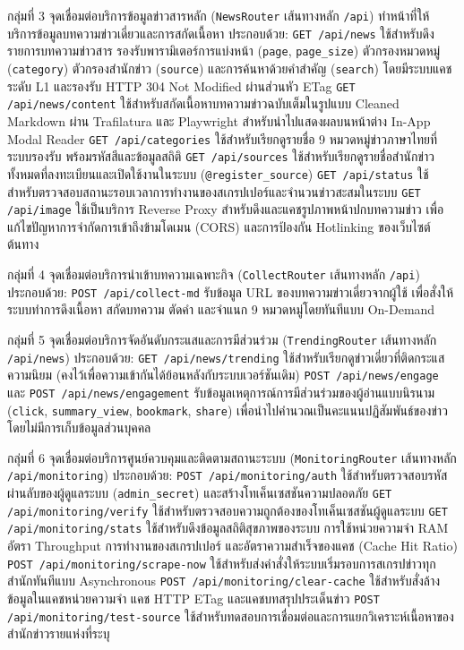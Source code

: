 กลุ่มที่ 3 จุดเชื่อมต่อบริการข้อมูลข่าวสารหลัก (\texttt{NewsRouter} เส้นทางหลัก \texttt{/api}) ทำหน้าที่ให้บริการข้อมูลบทความข่าวเดี่ยวและการสกัดเนื้อหา ประกอบด้วย:
\texttt{GET /api/news} ใช้สำหรับดึงรายการบทความข่าวสาร รองรับพารามิเตอร์การแบ่งหน้า (\texttt{page}, \texttt{page\_size}) ตัวกรองหมวดหมู่ (\texttt{category}) ตัวกรองสำนักข่าว (\texttt{source}) และการค้นหาด้วยคำสำคัญ (\texttt{search}) โดยมีระบบแคชระดับ L1 และรองรับ HTTP 304 Not Modified ผ่านส่วนหัว ETag
\texttt{GET /api/news/content} ใช้สำหรับสกัดเนื้อหาบทความข่าวฉบับเต็มในรูปแบบ Cleaned Markdown ผ่าน Trafilatura และ Playwright สำหรับนำไปแสดงผลบนหน้าต่าง In-App Modal Reader
\texttt{GET /api/categories} ใช้สำหรับเรียกดูรายชื่อ 9 หมวดหมู่ข่าวภาษาไทยที่ระบบรองรับ พร้อมรหัสสีและข้อมูลสถิติ
\texttt{GET /api/sources} ใช้สำหรับเรียกดูรายชื่อสำนักข่าวทั้งหมดที่ลงทะเบียนและเปิดใช้งานในระบบ (\texttt{@register\_source})
\texttt{GET /api/status} ใช้สำหรับตรวจสอบสถานะรอบเวลาการทำงานของสเกรปเปอร์และจำนวนข่าวสะสมในระบบ
\texttt{GET /api/image} ใช้เป็นบริการ Reverse Proxy สำหรับดึงและแคชรูปภาพหน้าปกบทความข่าว เพื่อแก้ไขปัญหาการจำกัดการเข้าถึงข้ามโดเมน (CORS) และการป้องกัน Hotlinking ของเว็บไซต์ต้นทาง

กลุ่มที่ 4 จุดเชื่อมต่อบริการนำเข้าบทความเฉพาะกิจ (\texttt{CollectRouter} เส้นทางหลัก \texttt{/api}) ประกอบด้วย:
\texttt{POST /api/collect-md} รับข้อมูล URL ของบทความข่าวเดี่ยวจากผู้ใช้ เพื่อสั่งให้ระบบทำการดึงเนื้อหา สกัดบทความ ตัดคำ และจำแนก 9 หมวดหมู่โดยทันทีแบบ On-Demand

กลุ่มที่ 5 จุดเชื่อมต่อบริการจัดอันดับกระแสและการมีส่วนร่วม (\texttt{TrendingRouter} เส้นทางหลัก \texttt{/api/news}) ประกอบด้วย:
\texttt{GET /api/news/trending} ใช้สำหรับเรียกดูข่าวเดี่ยวที่ติดกระแสความนิยม (คงไว้เพื่อความเข้ากันได้ย้อนหลังกับระบบเวอร์ชันเดิม)
\texttt{POST /api/news/engage} และ \texttt{POST /api/news/engagement} รับข้อมูลเหตุการณ์การมีส่วนร่วมของผู้อ่านแบบนิรนาม (\texttt{click}, \texttt{summary\_view}, \texttt{bookmark}, \texttt{share}) เพื่อนำไปคำนวณเป็นคะแนนปฏิสัมพันธ์ของข่าวโดยไม่มีการเก็บข้อมูลส่วนบุคคล

กลุ่มที่ 6 จุดเชื่อมต่อบริการศูนย์ควบคุมและติดตามสถานะระบบ (\texttt{MonitoringRouter} เส้นทางหลัก \texttt{/api/monitoring}) ประกอบด้วย:
\texttt{POST /api/monitoring/auth} ใช้สำหรับตรวจสอบรหัสผ่านลับของผู้ดูแลระบบ (\texttt{admin\_secret}) และสร้างโทเค็นเซสชันความปลอดภัย
\texttt{GET /api/monitoring/verify} ใช้สำหรับตรวจสอบความถูกต้องของโทเค็นเซสชันผู้ดูแลระบบ
\texttt{GET /api/monitoring/stats} ใช้สำหรับดึงข้อมูลสถิติสุขภาพของระบบ การใช้หน่วยความจำ RAM อัตรา Throughput การทำงานของสเกรปเปอร์ และอัตราความสำเร็จของแคช (Cache Hit Ratio)
\texttt{POST /api/monitoring/scrape-now} ใช้สำหรับส่งคำสั่งให้ระบบเริ่มรอบการสเกรปข่าวทุกสำนักทันทีแบบ Asynchronous
\texttt{POST /api/monitoring/clear-cache} ใช้สำหรับสั่งล้างข้อมูลในแคชหน่วยความจำ แคช HTTP ETag และแคชบทสรุปประเด็นข่าว
\texttt{POST /api/monitoring/test-source} ใช้สำหรับทดสอบการเชื่อมต่อและการแยกวิเคราะห์เนื้อหาของสำนักข่าวรายแห่งที่ระบุ

